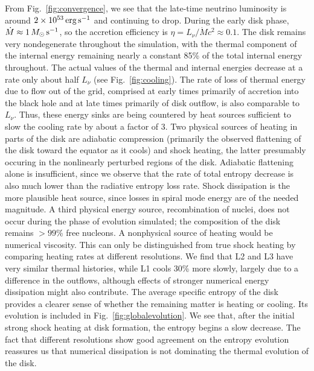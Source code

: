 From Fig.~\ref{fig:convergence}, we see that the late-time
neutrino luminosity is around $2\times 10^{53}\rm\,erg\,s^{-1}$
and continuing to drop.  During the early disk phase,
$\dot{M} \approx 1\,M_{\odot}\rm\,s^{-1}$, so the
accretion efficiency is $\eta=L_{\nu}/\dot{M}c^2 \approx 0.1$. 
The disk remains very nondegenerate throughout the simulation, with
the thermal component of the internal energy remaining nearly
a constant 85\% of the total internal energy throughout.
The actual values of the thermal and internal energies
decrease at a rate only about half $L_{\nu}$ (see Fig.~\ref{fig:cooling}).
The rate of loss of thermal energy due to flow out of the grid,
comprised at early times primarily of accretion into the black hole
and at late times primarily of disk outflow, is also comparable
to $L_{\nu}$.  Thus, these energy sinks are being countered
by heat sources sufficient to slow the cooling rate by about a
factor of 3.  Two physical sources of heating in parts of the disk are
adiabatic compression (primarily the observed flattening of the disk
toward the equator as it cools) and shock heating, the latter presumably
occuring in the nonlinearly perturbed regions of the disk.  Adiabatic
flattening alone is insufficient, since we observe that the rate of
total entropy decrease is also much lower than the radiative entropy
loss rate.  Shock dissipation is the more plausible heat source, since
losses in spiral mode energy are of the needed magnitude.
A third physical energy source, recombination of nuclei, does not occur
during the phase of evolution simulated;
the composition of the disk remains $>99$\% free nucleons. 
A nonphysical source of heating would be numerical viscosity. 
This can only be distinguished from true shock heating by
comparing heating rates at different resolutions.  We find that
L2 and L3 have very similar thermal histories, while L1
cools 30\% more slowly, largely due to a difference in the outflows,
although effects of stronger numerical energy dissipation might
also contribute.  The average specific
entropy of the disk provides a clearer sense of whether the remaining
matter is heating or cooling.  Its evolution is included in
Fig.~\ref{fig:globalevolution}.  We see that, after the initial
strong shock heating at disk formation, the entropy begins a slow
decrease.  The fact that different resolutions show good agreement
on the entropy evolution reassures us that numerical dissipation
is not dominating the thermal evolution of the disk.


